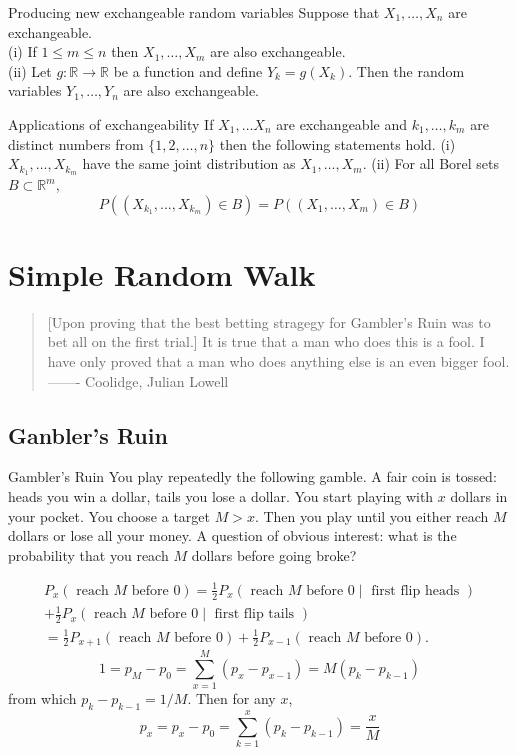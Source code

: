 \documentclass[11pt]{elegantbook}
\begin{document}
\begin{corollary}{Producing new exchangeable random variables}
Suppose that $X_1, \ldots, X_n$ are exchangeable.\\
(i) If $1 \leq m \leq n$ then $X_1, \ldots, X_m$ are also exchangeable.\\
(ii) Let $g: \mathbb{R} \rightarrow \mathbb{R}$ be a function and define $Y_k=g\left(X_k\right)$. Then the random variables $Y_1, \ldots, Y_n$ are also exchangeable.
\end{corollary}

\begin{corollary}{Applications of exchangeability}
 If $X_1, \ldots X_n$ are exchangeable and $k_1, \ldots, k_m$ are distinct numbers from $\{1,2, \ldots, n\}$ then the following statements hold.
(i) $X_{k_1}, \ldots, X_{k_m}$ have the same joint distribution as $X_1, \ldots, X_m$.
(ii) For all Borel sets $B \subset \mathbb{R}^m$,
$$
P\left(\left(X_{k_1}, \ldots, X_{k_m}\right) \in B\right)=P\left(\left(X_1, \ldots, X_m\right) \in B\right)
$$
\end{corollary}
\chapter{Simple Random Walk}
\begin{quotation}
[Upon proving that the best betting stragegy for Gambler's Ruin was to bet all on the first trial.] It is true that a man who does this is a fool. I have only proved that a man who does anything else is an even bigger fool.    \hfill ------- Coolidge, Julian Lowell 
\end{quotation}

\section{Ganbler's Ruin}
\begin{example}{Gambler's Ruin}
 You play repeatedly the following gamble. A fair coin is tossed: heads you win a dollar, tails you lose a dollar. You start playing with $x$ dollars in your pocket. You choose a target $M>x$. Then you play until you either reach $M$ dollars or lose all your money. A question of obvious interest: what is the probability that you reach $M$ dollars before going broke?
 
$$
\begin{gathered}
P_x(\text { reach } M \text { before } 0)=\frac{1}{2} P_x(\text { reach } M \text { before } 0 \mid \text { first flip heads }) \\
+\frac{1}{2} P_x(\text { reach } M \text { before } 0 \mid \text { first flip tails }) \\
=\frac{1}{2} P_{x+1}(\text { reach } M \text { before } 0)+\frac{1}{2} P_{x-1}(\text { reach } M \text { before } 0) .
\end{gathered}
$$
$$
1=p_M-p_0=\sum_{x=1}^M\left(p_x-p_{x-1}\right)=M\left(p_k-p_{k-1}\right)
$$
from which $p_k-p_{k-1}=1 / M$. Then for any $x$,
$$
p_x=p_x-p_0=\sum_{k=1}^x\left(p_k-p_{k-1}\right)=\frac{x}{M}
$$
\end{example}
\end{document}
